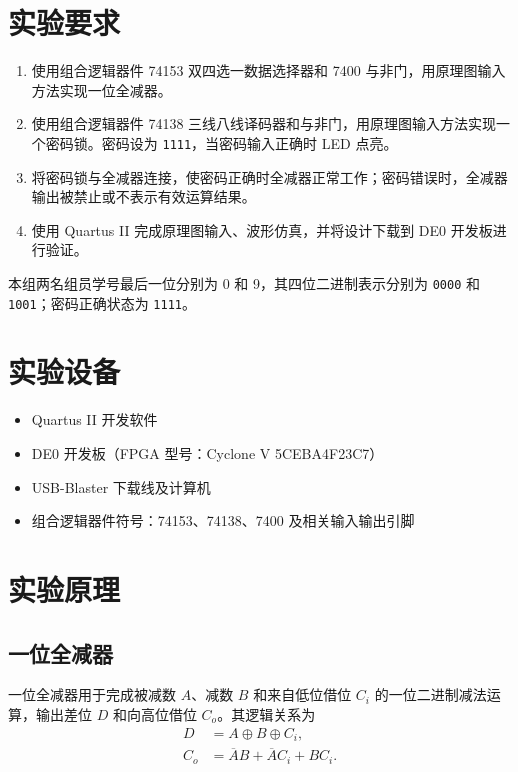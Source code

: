 \documentclass[12pt]{ctexart}
\begin{document}
\section{实验要求}

\begin{enumerate}
    \item 使用组合逻辑器件 74153 双四选一数据选择器和 7400 与非门，用原理图输入方法实现一位全减器。
    \item 使用组合逻辑器件 74138 三线八线译码器和与非门，用原理图输入方法实现一个密码锁。密码设为 \texttt{1111}，当密码输入正确时 LED 点亮。
    \item 将密码锁与全减器连接，使密码正确时全减器正常工作；密码错误时，全减器输出被禁止或不表示有效运算结果。
    \item 使用 Quartus II 完成原理图输入、波形仿真，并将设计下载到 DE0 开发板进行验证。
\end{enumerate}

本组两名组员学号最后一位分别为 0 和 9，其四位二进制表示分别为 \texttt{0000} 和 \texttt{1001}；密码正确状态为 \texttt{1111}。

\section{实验设备}

\begin{itemize}
    \item Quartus II 开发软件
    \item DE0 开发板（FPGA 型号：Cyclone V 5CEBA4F23C7）
    \item USB-Blaster 下载线及计算机
    \item 组合逻辑器件符号：74153、74138、7400 及相关输入输出引脚
\end{itemize}

\section{实验原理}

\subsection{一位全减器}

一位全减器用于完成被减数 $A$、减数 $B$ 和来自低位借位 $C_i$ 的一位二进制减法运算，输出差位 $D$ 和向高位借位 $C_o$。其逻辑关系为
\begin{align}
    D &= A \oplus B \oplus C_i, \\
    C_o &= \overline{A}B + \overline{A}C_i + BC_i.
\end{align}
\end{document}
